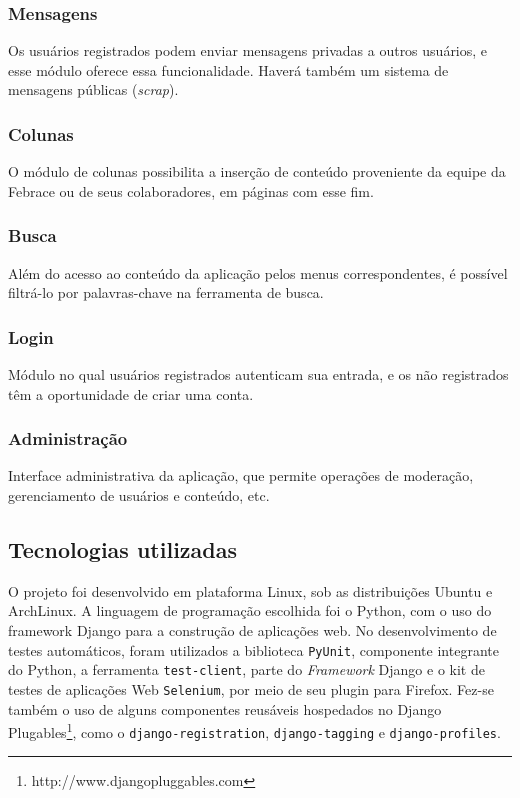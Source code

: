     \subsubsection{Mensagens}
      Os usuários registrados podem enviar mensagens privadas a outros usuários, e esse módulo oferece essa funcionalidade. Haverá também um sistema de mensagens públicas (\textit{scrap}).

    \subsubsection{Colunas}
      O módulo de colunas possibilita a inserção de conteúdo proveniente da equipe da Febrace ou de seus colaboradores, em páginas com esse fim.

    \subsubsection{Busca}
      Além do acesso ao conteúdo da aplicação pelos menus correspondentes, é possível filtrá-lo por palavras-chave na ferramenta de busca.

    \subsubsection{Login}
      Módulo no qual usuários registrados autenticam sua entrada, e os não registrados têm a oportunidade de criar uma conta.

    \subsubsection{Administração}
      Interface administrativa da aplicação, que permite operações de moderação, gerenciamento de usuários e conteúdo, etc.

  \subsection{Tecnologias utilizadas}\label{tecnologias}

    O projeto foi desenvolvido em plataforma Linux, sob as distribuições Ubuntu e ArchLinux. A linguagem de programação escolhida foi o Python, com o uso do framework Django para a construção de aplicações web. No desenvolvimento de testes automáticos, foram utilizados a biblioteca \texttt{PyUnit}, componente integrante do Python, a ferramenta \texttt{test-client}, parte do \textit{Framework} Django e o kit de testes de aplicações Web \texttt{Selenium}, por meio de seu plugin para Firefox. Fez-se também o uso de alguns componentes reusáveis hospedados no Django Plugables\footnote{http://www.djangopluggables.com}, como o \texttt{django-registration}, \texttt{django-tagging} e \texttt{django-profiles}.

